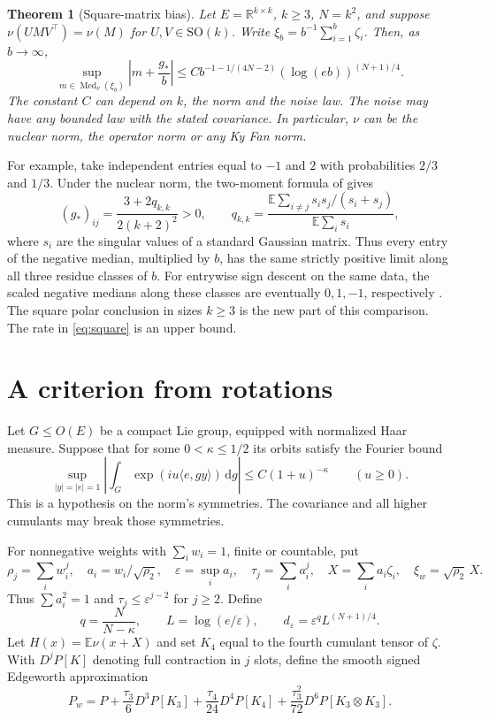 \documentclass[10pt,letterpaper]{article}
\newtheorem{theorem}{Theorem}
\newcommand{\E}{\mathbb E}
\newcommand{\R}{\mathbb R}
\newcommand{\ip}[2]{\langle #1,#2\rangle}
\newcommand{\Med}{\operatorname{Med}}
\newcommand{\SO}{\mathrm{SO}}
\newcommand{\eps}{\varepsilon}
\newcommand{\gstar}{g_{\!*}}
\newcommand{\dd}{\,\mathrm d}
\begin{document}
\begin{theorem}[Square-matrix bias]\label{th:square}
Let $E=\R^{k\times k}$, $k\ge3$, $N=k^2$, and suppose $\nu(UMV^\top)=\nu(M)$ for $U,V\in\SO(k)$. Write $\xi_b=b^{-1}\sum_{i=1}^b\zeta_i$. Then, as $b\to\infty$,
\begin{equation}
 \sup_{m\in\Med_\nu(\xi_b)}
 \left|m+\frac{\gstar}{b}\right|
 \le C b^{-1-1/(4N-2)}(\log(eb))^{(N+1)/4}.
 \label{eq:square}
\end{equation}
The constant $C$ can depend on $k$, the norm and the noise law. The noise may have any bounded law with the stated covariance. In particular, $\nu$ can be the nuclear norm, the operator norm or any Ky Fan norm.
\end{theorem}

For example, take independent entries equal to $-1$ and $2$ with probabilities $2/3$ and $1/3$. Under the nuclear norm, the two-moment formula of \cite[Corollary 8]{pb} gives
\[
 (\gstar)_{ij}=\frac{3+2q_{k,k}}{2(k+2)^2}>0,\qquad
 q_{k,k}=\frac{\E\sum_{i\ne j}s_i s_j/(s_i+s_j)}{\E\sum_i s_i},
\]
where $s_i$ are the singular values of a standard Gaussian matrix. Thus every entry of the negative median, multiplied by $b$, has the same strictly positive limit along all three residue classes of $b$. For entrywise sign descent on the same data, the scaled negative medians along these classes are eventually $0,1,-1$, respectively \cite[Theorem 12]{db}. The square polar conclusion in sizes $k\ge3$ is the new part of this comparison. The rate in \eqref{eq:square} is an upper bound.

\section{A criterion from rotations}

Let $G\le O(E)$ be a compact Lie group, equipped with normalized Haar measure. Suppose that for some $0<\kappa\le1/2$ its orbits satisfy the Fourier bound
\begin{equation}
 \sup_{|y|=|e|=1}
 \left|\int_G \exp(iu\ip{e}{g y})\dd g\right|
 \le C(1+u)^{-\kappa}\qquad(u\ge0).
 \label{eq:orbits}
\end{equation}
This is a hypothesis on the norm's symmetries. The covariance and all higher cumulants may break those symmetries.

For nonnegative weights with $\sum_i w_i=1$, finite or countable, put
\[
 \rho_j=\sum_i w_i^j,\quad a_i=w_i/\sqrt{\rho_2},\quad
 \eps=\sup_i a_i,\quad \tau_j=\sum_i a_i^j,\quad
 X=\sum_i a_i\zeta_i,\quad \xi_w=\sqrt{\rho_2}\,X .
\]
Thus $\sum a_i^2=1$ and $\tau_j\le\eps^{j-2}$ for $j\ge2$. Define
\[
 q=\frac{N}{N-\kappa},\qquad
 L=\log(e/\eps),\qquad d_\eps=\eps^q L^{(N+1)/4}.
\]
Let $H(x)=\E\nu(x+X)$ and set $K_4$ equal to the fourth cumulant tensor of $\zeta$. With $D^jP[K]$ denoting full contraction in $j$ slots, define the smooth signed Edgeworth approximation
\begin{equation}
 P_w=P+\frac{\tau_3}{6}D^3P[K_3]
       +\frac{\tau_4}{24}D^4P[K_4]
       +\frac{\tau_3^2}{72}D^6P[K_3\otimes K_3].
 \label{eq:P}
\end{equation}
\end{document}
